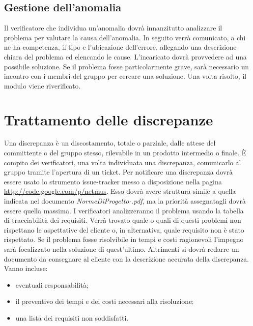 \subsection{Gestione dell'anomalia}

Il verificatore che individua un'anomalia dovr\`a innanzitutto analizzare il
problema per valutare la causa dell'anomalia.
In seguito verr\`a comunicato, a chi ne ha competenza, il tipo e l'ubicazione
dell'errore, allegando una descrizione chiara del problema ed elencando le
cause. L'incaricato dovr\`a provvedere ad una possibile soluzione. Se il
problema fosse particolarmente grave, sar\`a necessario un incontro con i membri 
del gruppo per cercare una soluzione. Una volta risolto, il modulo viene
riverificato.

\section{Trattamento delle discrepanze}

Una discrepanza \`e un discostamento, totale o parziale, dalle attese del
committente o del gruppo stesso, rilevabile in un prodotto intermedio
o finale. \`E compito dei verificatori, una volta individuata una discrepanza,
comunicarlo al gruppo tramite l'apertura di un ticket. Per notificare una
discrepanza dovr\`a essere usato lo strumento issue-tracker messo a disposizione nella pagina \url{http://code.google.com/p/netmus}. 
Esso dovr\`a avere struttura simile a quella indicata nel
documento \emph{NormeDiProgetto-\versionenormeprogetto.pdf}, ma la priorit\`a assegnatagli dovr\`a essere quella
massima. I verificatori analizzeranno il problema usando la tabella di
tracciabilit\`a dei requisiti. Verr\`a trovato quale o quali di questi problemi non
rispettano le aspettative del cliente o, in alternativa, quale requisito non \`e
stato rispettato. Se il problema fosse risolvibile in tempi e costi ragionevoli
l'impegno sar\`a focalizzato nella soluzione di quest'ultimo. Altrimenti si dovr\`a
redarre un documento da consegnare al cliente con la descrizione accurata della
discrepanza.\\

Vanno incluse:

\begin{itemize}

\item eventuali responsabilit\`a;
\item il preventivo dei tempi e dei costi necessari alla risoluzione;
\item una lista dei requisiti non soddisfatti.

\end{itemize}

